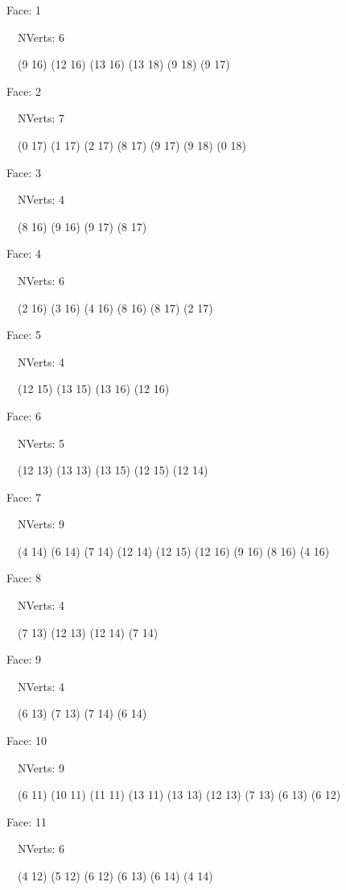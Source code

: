 \documentclass{article}
\begin{document}
{\footnotesize 

Face: 1

\   \    NVerts: 6

 \   \   (9 16) (12 16) (13 16) (13 18) (9 18) (9 17)}

{\footnotesize 

Face: 2

\   \    NVerts: 7

 \   \   (0 17) (1 17) (2 17) (8 17) (9 17) (9 18) (0 18)}

{\footnotesize 

Face: 3

\   \    NVerts: 4

 \   \   (8 16) (9 16) (9 17) (8 17)}

{\footnotesize 

Face: 4

\   \    NVerts: 6

 \   \   (2 16) (3 16) (4 16) (8 16) (8 17) (2 17)}

{\footnotesize 

Face: 5

\   \    NVerts: 4

 \   \   (12 15) (13 15) (13 16) (12 16)}

{\footnotesize 

Face: 6

\   \    NVerts: 5

 \   \   (12 13) (13 13) (13 15) (12 15) (12 14)}

{\footnotesize 

Face: 7

\   \    NVerts: 9

 \   \   (4 14) (6 14) (7 14) (12 14) (12 15) (12 16) (9 16) (8 16) (4 16)}

{\footnotesize 

Face: 8

\   \    NVerts: 4

 \   \   (7 13) (12 13) (12 14) (7 14)}

{\footnotesize 

Face: 9

\   \    NVerts: 4

 \   \   (6 13) (7 13) (7 14) (6 14)}

{\footnotesize 

Face: 10

\   \    NVerts: 9

 \   \   (6 11) (10 11) (11 11) (13 11) (13 13) (12 13) (7 13) (6 13) (6 12)}

{\footnotesize 

Face: 11

\   \    NVerts: 6

 \   \   (4 12) (5 12) (6 12) (6 13) (6 14) (4 14)}
\end{document}

